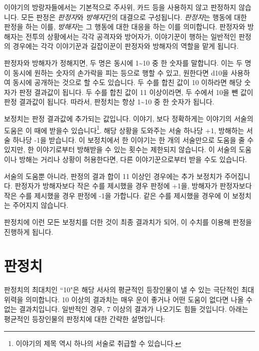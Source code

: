 \documentclass{report}
\begin{document}
	이야기의 방랑자들에서는 기본적으로 주사위, 카드 등을 사용하지 않고 판정하지 않습니다. 모든 판정은 \emph{판정자}와 \emph{방해자}간의 대결으로 구성됩니다. \emph{판정자}는 행동에 대한 판정을 하는 이를, \emph{방해자}는 그 행동에 대한 대응을 하는 이를 의미합니다. 판정자와 방해자는 전투의 상황에서는 각각 공격자와 방어자가, 이야기꾼이 행하는 일반적인 판정의 경우에는 각각 이야기꾼과 길잡이꾼이 판정자와 방해자의 역할을 맡게 됩니다.
	
	판정자와 방해자가 정해지면, 두 명은 동시에 1\textasciitilde10 중 한 숫자를 말합니다. 이는 두 명이 동시에 원하는 숫자의 손가락을 피는 등으로 행할 수 있고, 원한다면 d10을 사용하여 동시에 공개하는 것으로 할 수도 있습니다. 두 수를 합친 값이 10 이하라면 해당 숫자가 판정 결과값이 됩니다. 두 수를 합친 값이 11 이상이라면, 두 수에서 10을 뺀 값이 판정 결과값이 됩니다. 따라서, 판정치는 항상 1\textasciitilde10 중 한 숫자가 됩니다.
	
	보정치는 판정 결과값에 추가되는 값입니다. 이야기, 보다 정확하게는 이야기의 서술의 도움은 이 때에 받을수 있습니다\footnote{이야기의 제목 역시 하나의 서술로 취급할 수 있습니다.}. 해당 상황을 도와주는 서술 하나당 +1, 방해하는 서술 하나당 -1을 받습니다. 이 보정치에서 한 이야기는 한 개의 서술만으로 도움을 줄 수 있지만, 한 이야기로부터 방해받을 수 있는 횟수는 제한되지 않습니다. 이 서술의 도움이나 방해는 거리나 상황이 허용한다면, 다른 이야기꾼으로부터 받을 수도 있습니다.
	
	서술의 도움뿐 아니라, 판정의 결과 합이 11 이상인 경우에는 추가 보정치가 주어집니다. 판정자가 방해자보다 작은 수를 제시했을 경우 판정에 +1을, 방해자가 판정자보다 작은 수를 제시했을 경우 판정에 -1을 가합니다. 같은 수를 제시했을 경우에 이 보정치는 주어지지 않습니다.
	
	판정치에 이런 모든 보정치를 더한 것이 최종 결과치가 되어, 이 수치를 이용해 판정을 진행하게 됩니다.
	
	\section*{판정치}
	판정치의 최대치인 ``10"은 해당 서사의 평균적인 등장인물이 낼 수 있는 극단적인 최대 위력을 의미합니다. 10 이상의 결과치는 매우 운이 좋거나 어떤 도움이 없다면 나올 수 없는 결과치입니다. 일반적인 경우, 7 이상의 결과가 나오기도 힘들 것입니다. 아래는 평균적인 등장인물의 판정치에 대한 간략한 설명입니다:
	
\end{document}
